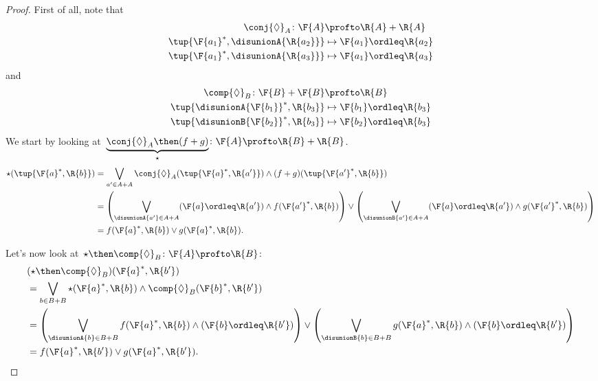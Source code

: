\begin{proof}
    First of all, note that
    \begin{equation}
        \begin{aligned}
            \conj{\Diamond}_A\colon \F{A}&\profto \R{A}+\R{A}\\
            \tup{\F{a_1}^*,\disunionA{\R{a_2}}}&\mapsto \F{a_1}\ordleq \R{a_2}\\
            \tup{\F{a_1}^*,\disunionA{\R{a_3}}}&\mapsto \F{a_1}\ordleq \R{a_3}
        \end{aligned}
    \end{equation}
    and
    \begin{equation}
        \begin{aligned}
            \comp{\Diamond}_B\colon \F{B}+\F{B}&\profto \R{B}\\
            \tup{\disunionA{\F{b_1}}^*,\R{b_3}}&\mapsto \F{b_1}\ordleq \R{b_3}\\
            \tup{\disunionB{\F{b_2}}^*,\R{b_3}}&\mapsto \F{b_2}\ordleq \R{b_3}
        \end{aligned}
    \end{equation}
    We start by looking at~$\underbrace{\conj{\Diamond}_A\then (f+g)}_{\star}\colon \F{A} \profto \R{B}+\R{B}$.
    \begin{equation}
        \begin{aligned}
            \star (\tup{\F{a}^*,\R{b}})&=\bigvee_{a'\in A+A} \conj{\Diamond}_A(\tup{\F{a}^*,\R{a'}})\wedge (f+g)(\tup{\F{a'}^*,\R{b}})\\
            &=\left( \bigvee_{\disunionA{a'}\in A+A} (\F{a}\ordleq \R{a'})\wedge f(\F{a'}^*,\R{b}) \right)\vee \left( \bigvee_{\disunionB{a'}\in A+A} (\F{a}\ordleq \R{a'})\wedge g(\F{a'}^*,\R{b}) \right)\\
            &=f(\F{a}^*,\R{b}) \vee g(\F{a}^*,\R{b}).
        \end{aligned}
    \end{equation}

    Let's now look at~$\star \then \comp{\Diamond}_B\colon \F{A} \profto \R{B}$:
    \begin{equation}
        \begin{aligned}
            &(\star \then \comp{\Diamond}_B)(\F{a}^*,\R{b'})\\
            &=\bigvee_{b\in B+B} \star(\F{a}^*,\R{b})\wedge \comp{\Diamond}_B(\F{b}^*,\R{b'}) \\
            &=\left(\bigvee_{\disunionA{b}\in B+B} f(\F{a}^*,\R{b}) \wedge (\F{b}\ordleq \R{b'})\right) \vee
            \left(\bigvee_{\disunionB{b}\in B+B} g(\F{a}^*,\R{b}) \wedge (\F{b}\ordleq \R{b'})\right)\\
            &=f(\F{a}^*,\R{b'})\vee g(\F{a}^*,\R{b'}).
        \end{aligned}
    \end{equation}
\end{proof}

